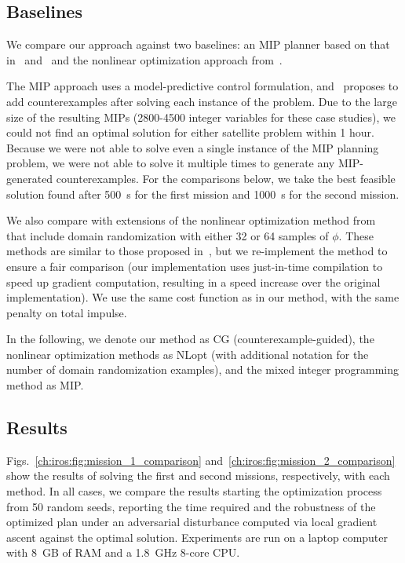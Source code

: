\subsection{Baselines}

We compare our approach against two baselines: an MIP planner based on that in~\cite{raman15} and~\cite{sadraddiniRobustTemporalLogic2016} and the nonlinear optimization approach from~\cite{pantSmoothOperatorControl2017,pantazidesSatelliteMissionPlanning2022}.

The MIP approach uses a model-predictive control formulation, and~\cite{raman15} proposes to add counterexamples after solving each instance of the problem. Due to the large size of the resulting MIPs (2800-4500 integer variables for these case studies), we could not find an optimal solution for either satellite problem within 1 hour. Because we were not able to solve even a single instance of the MIP planning problem, we were not able to solve it multiple times to generate any MIP-generated counterexamples. For the comparisons below, we take the best feasible solution found after \SI{500}{s} for the first mission and \SI{1000}{s} for the second mission.

We also compare with extensions of the nonlinear optimization method from~\cite{pantSmoothOperatorControl2017,pantazidesSatelliteMissionPlanning2022} that include domain randomization with either 32 or 64 samples of $\phi$. These methods are similar to those proposed in~\cite{leungBackPropagationSignalTemporal2021}, but we re-implement the method to ensure a fair comparison (our implementation uses just-in-time compilation to speed up gradient computation, resulting in a speed increase over the original implementation). We use the same cost function as in our method, with the same penalty on total impulse.

In the following, we denote our method as CG (counterexample-guided), the nonlinear optimization methods as NLopt (with additional notation for the number of domain randomization examples), and the mixed integer programming method as MIP.

\subsection{Results}

Figs.~\ref{ch:iros:fig:mission_1_comparison} and~\ref{ch:iros:fig:mission_2_comparison} show the results of solving the first and second missions, respectively, with each method. In all cases, we compare the results starting the optimization process from 50 random seeds, reporting the time required and the robustness of the optimized plan under an adversarial disturbance computed via local gradient ascent against the optimal solution. Experiments are run on a laptop computer with \SI{8}{GB} of RAM and a \SI{1.8}{GHz} 8-core CPU.

